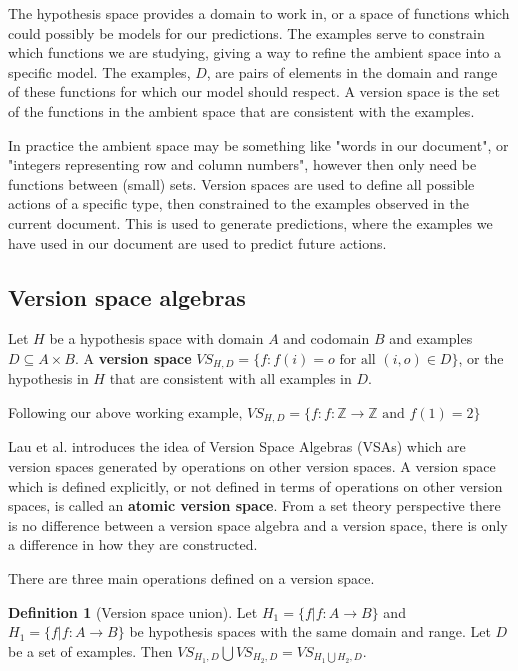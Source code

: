 \documentclass{article}
\theoremstyle{definition}
\newtheorem{definition}{Definition}[section]
\begin{document}
The hypothesis space provides a domain to work in, or a space of functions which could possibly be models for our predictions. The examples serve to constrain which functions we are studying, giving a way to refine the ambient space into a specific model.  The examples, $D$, are pairs of elements in the domain and range of these functions for which our model should respect. A version space is the set of the functions in the ambient space that are consistent with the examples. 

In practice the ambient space may be something like "words in our document", or "integers representing row and column numbers", however then only need be functions between (small) sets. Version spaces are used to define all possible actions of a specific type, then constrained to the examples observed in the current document. This is used to generate predictions, where the examples we have used in our document are used to predict future actions.

\subsection{Version space algebras}
Let $H$ be a hypothesis space with domain $A$ and codomain $B$ and examples $D \subseteq A \times B$. A \textbf{version space} $VS_{H,D} = \{f : f(i) = o \text{ for all } (i,o) \in D\}$, or the hypothesis in $H$ that are consistent with all examples in $D$. 

Following our above working example, $VS_{H,D} = \{f : f: \mathbb{Z} \rightarrow \mathbb{Z} \text{ and } f(1) = 2\}$

Lau et al.\cite{short} introduces the idea of Version Space Algebras (VSAs) which are version spaces generated by operations on other version spaces. A version space which is defined explicitly, or not defined in terms of operations on other version spaces, is called an \textbf{atomic version space}. From a set theory perspective there is no difference between a version space algebra and a version space, there is only a difference in how they are constructed. 

There are three main operations defined on a version space. 
\begin{definition}[Version space union]
    Let $H_1 = \{f | f: A \rightarrow B\}$ and $H_1 = \{f | f: A \rightarrow B\}$ be hypothesis spaces with the same domain and range. Let $D$ be a set of examples. Then $VS_{H_1, D} \bigcup VS_{H_2, D} = VS_{H_1\bigcup H_2, D}$. 
\end{definition}
\end{document}
